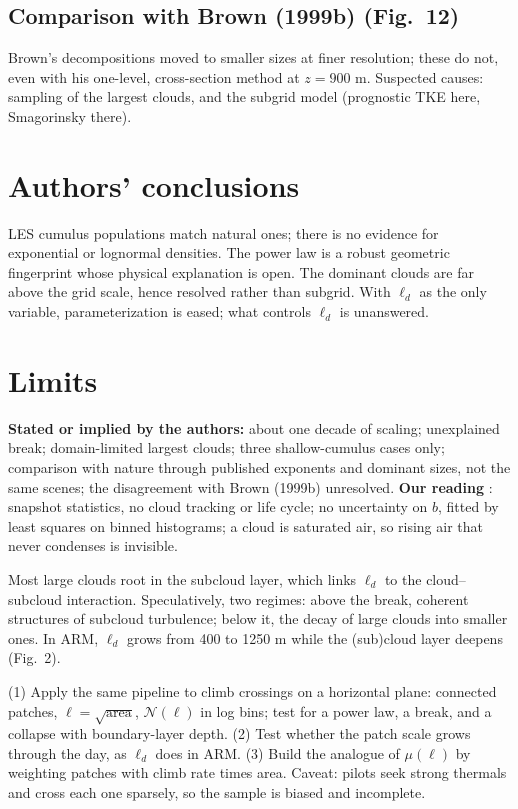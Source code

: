 \documentclass[10pt,a4paper]{article}
\begin{document}
\subsection{Comparison with Brown (1999b) (Fig.\ 12)} Brown's decompositions moved to smaller sizes at finer resolution; these do not, even with his one-level, cross-section method at $z=900$ m. Suspected causes: sampling of the largest clouds, and the subgrid model (prognostic TKE here, Smagorinsky there).

\section{Authors' conclusions}
LES cumulus populations match natural ones; there is no evidence for exponential or lognormal densities. The power law is a robust geometric fingerprint whose physical explanation is open. The dominant clouds are far above the grid scale, hence resolved rather than subgrid. With $\ell_d$ as the only variable, parameterization is eased; what controls $\ell_d$ is unanswered.

\section{Limits}
\textbf{Stated or implied by the authors:} about one decade of scaling; unexplained break; domain-limited largest clouds; three shallow-cumulus cases only; comparison with nature through published exponents and dominant sizes, not the same scenes; the disagreement with Brown (1999b) unresolved. \textbf{Our reading} \ours: snapshot statistics, no cloud tracking or life cycle; no uncertainty on $b$, fitted by least squares on binned histograms; a cloud is saturated air, so rising air that never condenses is invisible.

\begin{tcbraster}[raster columns=2,raster equal height=rows,raster column skip=3mm,raster force size=false]
\begin{paperbox}
Most large clouds root in the subcloud layer, which links $\ell_d$ to the cloud--subcloud interaction. Speculatively, two regimes: above the break, coherent structures of subcloud turbulence; below it, the decay of large clouds into smaller ones. In ARM, $\ell_d$ grows from 400 to \num{1250} m while the (sub)cloud layer deepens (Fig.\ 2).
\end{paperbox}
\begin{ideabox}
(1) Apply the same pipeline to climb crossings on a horizontal plane: connected patches, $\ell=\sqrt{\text{area}}$, $\mathcal N(\ell)$ in log bins; test for a power law, a break, and a collapse with boundary-layer depth. (2) Test whether the patch scale grows through the day, as $\ell_d$ does in ARM. (3) Build the analogue of $\mu(\ell)$ by weighting patches with climb rate times area. Caveat: pilots seek strong thermals and cross each one sparsely, so the sample is biased and incomplete.
\end{ideabox}
\end{tcbraster}
\end{document}
